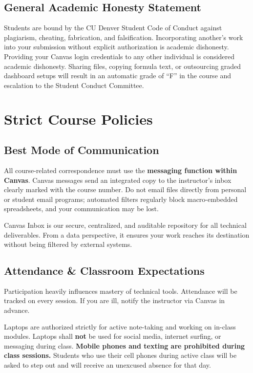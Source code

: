 \documentclass[11pt,a4paper]{article}
\begin{document}
\subsection*{General Academic Honesty Statement}
Students are bound by the CU Denver Student Code of Conduct against plagiarism, cheating, fabrication, and falsification. Incorporating another's work into your submission without explicit authorization is academic dishonesty. Providing your Canvas login credentials to any other individual is considered academic dishonesty. Sharing files, copying formula text, or outsourcing graded dashboard setups will result in an automatic grade of ``F'' in the course and escalation to the Student Conduct Committee.

\section*{Strict Course Policies}

\subsection*{Best Mode of Communication}
All course-related correspondence must use the \textbf{messaging function within Canvas}. Canvas messages send an integrated copy to the instructor's inbox clearly marked with the course number. Do not email files directly from personal or student email programs; automated filters regularly block macro-embedded spreadsheets, and your communication may be lost.

Canvas Inbox is our secure, centralized, and auditable repository for all technical deliverables. From a data perspective, it ensures your work reaches its destination without being filtered by external systems.

\subsection*{Attendance \& Classroom Expectations}
Participation heavily influences mastery of technical tools. Attendance will be tracked on every session. If you are ill, notify the instructor via Canvas in advance.

Laptops are authorized strictly for active note-taking and working on in-class modules. Laptops shall \textbf{not} be used for social media, internet surfing, or messaging during class. \textbf{Mobile phones and texting are prohibited during class sessions.} Students who use their cell phones during active class will be asked to step out and will receive an unexcused absence for that day.
\end{document}
